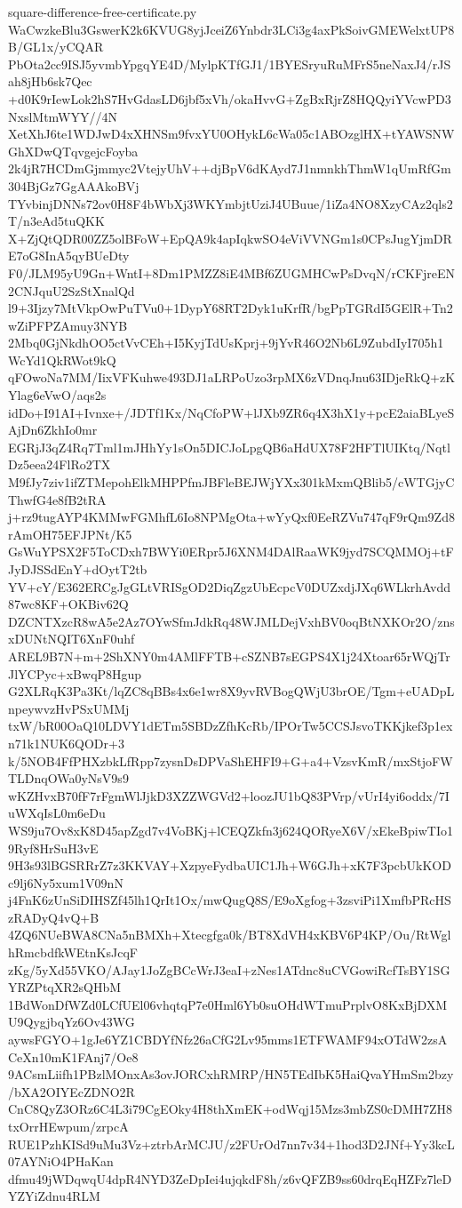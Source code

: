\documentclass[11pt]{article}
\theoremstyle{definition}
\theoremstyle{remark}
\begin{document}
\begin{filecontents*}[overwrite]{square-difference-free-certificate.py}
WaCwzkeBlu3GswerK2k6KVUG8yjJceiZ6Ynbdr3LCi3g4axPkSoivGMEWelxtUP8B/GL1x/yCQAR
PbOta2cc9ISJ5yvmbYpgqYE4D/MylpKTfGJ1/1BYESryuRuMFrS5neNaxJ4/rJSah8jHb6sk7Qec
+d0K9rIewLok2hS7HvGdasLD6jbf5xVh/okaHvvG+ZgBxRjrZ8HQQyiYVcwPD3NxslMtmWYY//4N
XetXhJ6te1WDJwD4xXHNSm9fvxYU0OHykL6cWa05c1ABOzglHX+tYAWSNWGhXDwQTqvgejcFoyba
2k4jR7HCDmGjmmyc2VtejyUhV++djBpV6dKAyd7J1nmnkhThmW1qUmRfGm304BjGz7GgAAAkoBVj
TYvbinjDNNs72ov0H8F4bWbXj3WKYmbjtUziJ4UBuue/1iZa4NO8XzyCAz2qls2T/n3eAd5tuQKK
X+ZjQtQDR00ZZ5olBFoW+EpQA9k4apIqkwSO4eViVVNGm1s0CPsJugYjmDRE7oG8InA5qyBUeDty
F0/JLM95yU9Gn+WntI+8Dm1PMZZ8iE4MBf6ZUGMHCwPsDvqN/rCKFjreEN2CNJquU2SzStXnalQd
l9+3Ijzy7MtVkpOwPuTVu0+1DypY68RT2Dyk1uKrfR/bgPpTGRdI5GElR+Tn2wZiPFPZAmuy3NYB
2Mbq0GjNkdhOO5ctVvCEh+I5KyjTdUsKprj+9jYvR46O2Nb6L9ZubdIyI705h1WcYd1QkRWot9kQ
qFOwoNa7MM/IixVFKuhwe493DJ1aLRPoUzo3rpMX6zVDnqJnu63IDjeRkQ+zKYlag6eVwO/aqs2s
idDo+I91AI+Ivnxe+/JDTf1Kx/NqCfoPW+lJXb9ZR6q4X3hX1y+pcE2aiaBLyeSAjDn6ZkhIo0mr
EGRjJ3qZ4Rq7Tml1mJHhYy1sOn5DICJoLpgQB6aHdUX78F2HFTlUIKtq/NqtlDz5eea24FlRo2TX
M9fJy7ziv1ifZTMepohElkMHPPfmJBFleBEJWjYXx301kMxmQBlib5/cWTGjyCThwfG4e8fB2tRA
j+rz9tugAYP4KMMwFGMhfL6Io8NPMgOta+wYyQxf0EeRZVu747qF9rQm9Zd8rAmOH75EFJPNt/K5
GsWuYPSX2F5ToCDxh7BWYi0ERpr5J6XNM4DAlRaaWK9jyd7SCQMMOj+tFJyDJSSdEnY+dOytT2tb
YV+cY/E362ERCgJgGLtVRISgOD2DiqZgzUbEcpcV0DUZxdjJXq6WLkrhAvdd87wc8KF+OKBiv62Q
DZCNTXzcR8wA5e2Az7OYwSfmJdkRq48WJMLDejVxhBV0oqBtNXKOr2O/znsxDUNtNQIT6XnF0uhf
AREL9B7N+m+2ShXNY0m4AMlFFTB+cSZNB7sEGPS4X1j24Xtoar65rWQjTrJlYCPyc+xBwqP8Hgup
G2XLRqK3Pa3Kt/lqZC8qBBs4x6e1wr8X9yvRVBogQWjU3brOE/Tgm+eUADpLnpeywvzHvPSxUMMj
txW/bR00OaQ10LDVY1dETm5SBDzZfhKcRb/IPOrTw5CCSJsvoTKKjkef3p1exn71k1NUK6QODr+3
k/5NOB4FfPHXzbkLfRpp7zysnDsDPVaShEHFI9+G+a4+VzsvKmR/mxStjoFWTLDnqOWa0yNsV9s9
wKZHvxB70fF7rFgmWlJjkD3XZZWGVd2+loozJU1bQ83PVrp/vUrI4yi6oddx/7IuWXqIsL0m6eDu
WS9ju7Ov8xK8D45apZgd7v4VoBKj+lCEQZkfn3j624QORyeX6V/xEkeBpiwTIo19Ryf8HrSuH3vE
9H3s93lBGSRRrZ7z3KKVAY+XzpyeFydbaUIC1Jh+W6GJh+xK7F3pcbUkKODc9lj6Ny5xum1V09nN
j4FnK6zUnSiDIHSZf45lh1QrIt1Ox/mwQugQ8S/E9oXgfog+3zsviPi1XmfbPRcHSzRADyQ4vQ+B
4ZQ6NUeBWA8CNa5nBMXh+Xtecgfga0k/BT8XdVH4xKBV6P4KP/Ou/RtWglhRmcbdfkWEtnKsJcqF
zKg/5yXd55VKO/AJay1JoZgBCcWrJ3eaI+zNes1ATdnc8uCVGowiRcfTsBY1SGYRZPtqXR2sQHbM
1BdWonDfWZd0LCfUEl06vhqtqP7e0Hml6Yb0suOHdWTmuPrplvO8KxBjDXMU9QygjbqYz6Ov43WG
aywsFGYO+1gJe6YZ1CBDYfNfz26aCfG2Lv95mms1ETFWAMF94xOTdW2zsACeXn10mK1FAnj7/Oe8
9ACsmLiifh1PBzlMOnxAs3ovJORCxhRMRP/HN5TEdIbK5HaiQvaYHmSm2bzy/bXA2OIYEcZDNO2R
CnC8QyZ3ORz6C4L3i79CgEOky4H8thXmEK+odWqj15Mzs3mbZS0cDMH7ZH8txOrrHEwpum/zrpcA
RUE1PzhKISd9uMu3Vz+ztrbArMCJU/z2FUrOd7nn7v34+1hod3D2JNf+Yy3kcL07AYNiO4PHaKan
dfmu49jWDqwqU4dpR4NYD3ZeDpIei4ujqkdF8h/z6vQFZB9ss60drqEqHZFz7leDYZYiZdnu4RLM

\end{filecontents*}
\end{document}

